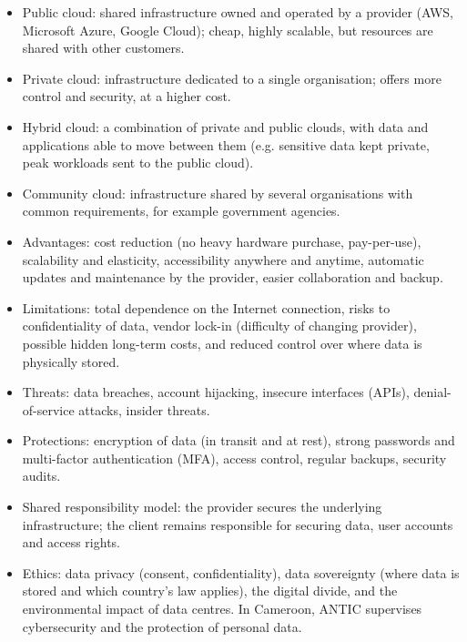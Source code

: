 \documentclass[11pt]{article}
\newcommand{\cle}[1]{{\popxbold\color{popdark}#1}}
\begin{document}
\begin{aretenir}
\begin{itemize}
  \item \cle{Public cloud}: shared infrastructure owned and operated by a provider (AWS, Microsoft Azure, Google Cloud); cheap, highly scalable, but resources are shared with other customers.
  \item \cle{Private cloud}: infrastructure dedicated to a single organisation; offers more control and security, at a higher cost.
  \item \cle{Hybrid cloud}: a combination of private and public clouds, with data and applications able to move between them (e.g. sensitive data kept private, peak workloads sent to the public cloud).
  \item \cle{Community cloud}: infrastructure shared by several organisations with common requirements, for example government agencies.
\end{itemize}
\end{aretenir}

\begin{aretenir}
\begin{itemize}
  \item Advantages: cost reduction (no heavy hardware purchase, pay-per-use), scalability and elasticity, accessibility anywhere and anytime, automatic updates and maintenance by the provider, easier collaboration and backup.
  \item Limitations: total dependence on the Internet connection, risks to confidentiality of data, vendor lock-in (difficulty of changing provider), possible hidden long-term costs, and reduced control over where data is physically stored.
\end{itemize}
\end{aretenir}

\begin{aretenir}
\begin{itemize}
  \item Threats: data breaches, account hijacking, insecure interfaces (APIs), denial-of-service attacks, insider threats.
  \item Protections: \cle{encryption} of data (in transit and at rest), strong passwords and \cle{multi-factor authentication} (MFA), access control, regular backups, security audits.
  \item \cle{Shared responsibility model}: the provider secures the underlying infrastructure; the client remains responsible for securing data, user accounts and access rights.
  \item Ethics: data privacy (consent, confidentiality), \cle{data sovereignty} (where data is stored and which country's law applies), the digital divide, and the environmental impact of data centres. In Cameroon, ANTIC supervises cybersecurity and the protection of personal data.
\end{itemize}
\end{aretenir}
\end{document}
